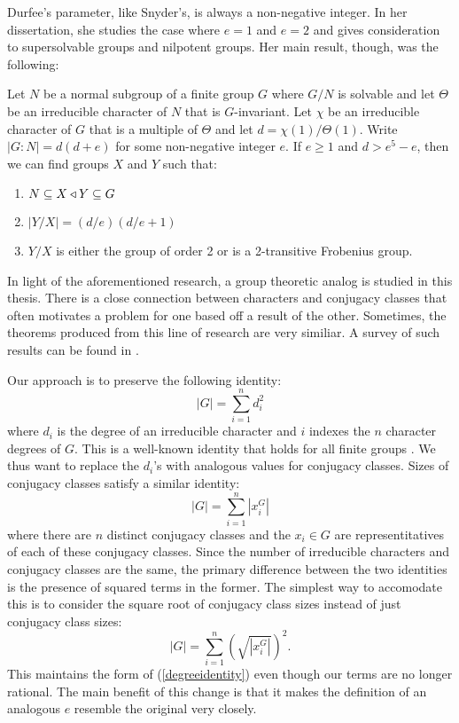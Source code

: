 \documentclass[main.tex]{subfiles}
\begin{document}
\hss

\noindent Durfee's parameter, like Snyder's, is always a non-negative integer. In her dissertation, she studies the case where $e = 1$ and $e = 2$ and gives consideration to supersolvable groups and nilpotent groups. Her main result, though, was the following:

\hss

\begin{theorem}
Let $N$ be a normal subgroup of a finite group $G$ where $G/N$ is solvable and let $\Theta$ be an irreducible character of $N$ that is $G$-invariant. Let $\chi$ be an irreducible character of $G$ that is a multiple of $\Theta$ and let $d = \chi(1)/\Theta(1)$. Write $|G:N| = d(d+e)$ for some non-negative integer $e$. If $e \ge 1$ and $d > e^5 - e$, then we can find groups $X$ and $Y$ such that:
\begin{enumerate}
	\item $N \subseteq X \triangleleft Y \subseteq G$
	\item $|Y/X| = (d/e)(d/e+1)$
	\item $Y/X$ is either the group of order 2 or is a 2-transitive Frobenius group.
\end{enumerate}
\end{theorem}

\hss

In light of the aforementioned research, a group theoretic analog is studied in this thesis. There is a close connection between characters and conjugacy classes that often motivates a problem for one based off a result of the other. Sometimes, the theorems produced from this line of research are very similiar. A survey of such results can be found in \cite{chillagarticle}.

Our approach is to preserve the following identity:
\begin{equation}\label{degreeidentity}
|G| = \sum_{i=1}^n d_i^2
\end{equation}
where $d_i$ is the degree of an irreducible character and $i$ indexes the $n$ character degrees of $G$. This is a well-known identity that holds for all finite groups \cite{gorensteinfinitegroups}. We thus want to replace the $d_i$'s with analogous values for conjugacy classes. Sizes of conjugacy classes satisfy a similar identity:
$$|G| = \sum_{i=1}^n |x_i^G|$$
where there are $n$ distinct conjugacy classes and the $x_i \in G$ are representitatives of each of these conjugacy classes. Since the number of irreducible characters and conjugacy classes are the same, the primary difference between the two identities is the presence of squared terms in the former. The simplest way to accomodate this is to consider the square root of conjugacy class sizes instead of just conjugacy class sizes:
$$|G| = \sum_{i=1}^n \left(\sqrt{|x_i^G|}\right)^2\text{.}$$
This maintains the form of (\ref{degreeidentity}) even though our terms are no longer rational. The main benefit of this change is that it makes the definition of an analogous $e$ resemble the original very closely.
\end{document}
